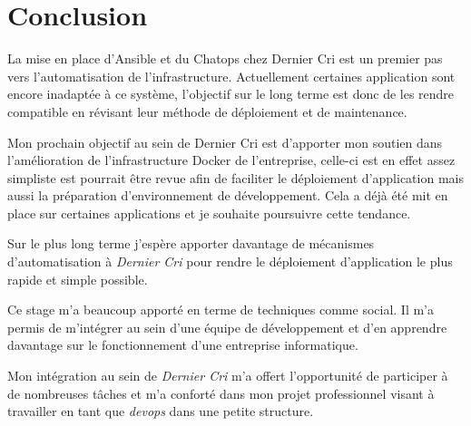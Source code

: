 \newpage

\section{Conclusion}\label{conclusion}

\bigskip

La mise en place d'Ansible et du Chatops chez Dernier Cri est un premier
pas vers l'automatisation de l'infrastructure. Actuellement certaines
application sont encore inadaptée à ce système, l'objectif sur le long
terme est donc de les rendre compatible en révisant leur méthode de
déploiement et de maintenance.

\bigskip

Mon prochain objectif au sein de Dernier Cri est d'apporter mon soutien
dans l'amélioration de l'infrastructure Docker de l'entreprise, celle-ci
est en effet assez simpliste est pourrait être revue afin de faciliter
le déploiement d'application mais aussi la préparation d'environnement
de développement. Cela a déjà été mit en place sur certaines
applications et je souhaite poursuivre cette tendance.

\bigskip

Sur le plus long terme j'espère apporter davantage de mécanismes
d'automatisation à \emph{Dernier Cri} pour rendre le déploiement
d'application le plus rapide et simple possible.

\bigskip

Ce stage m'a beaucoup apporté en terme de techniques comme social. Il
m'a permis de m'intégrer au sein d'une équipe de développement et d'en
apprendre davantage sur le fonctionnement d'une entreprise informatique.

\bigskip

Mon intégration au sein de \emph{Dernier Cri} m'a offert l'opportunité
de participer à de nombreuses tâches et m'a conforté dans mon projet
professionnel visant à travailler en tant que \emph{devops} dans une
petite structure.
